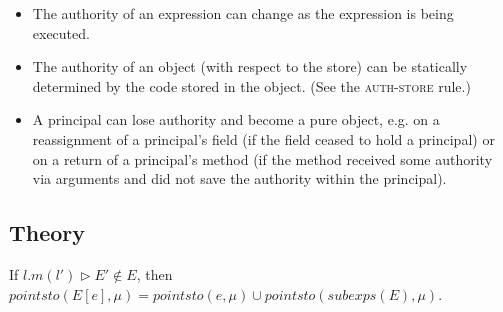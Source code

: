\documentclass{llncs}
\begin{document}
\begin{itemize}
\item The authority of an expression can change as the expression is being executed.

\item The authority of an object (with respect to the store) can be statically determined by the code stored in the object. (See the \textsc{auth-store} rule.)

\item A principal can lose authority and become a pure object, e.g. on a reassignment of a principal's field (if the field ceased to hold a principal) or on a return of a principal's method (if the method received some authority via arguments and did not save the authority within the principal).

\end{itemize}


\newpage

\subsection{Theory}

\begin{mdframed}
\begin{lemma}
\label{l:ses-e}
If $l.m(l') \rhd E' \not\in E$, then $pointsto(E[e], \mu) = pointsto(e, \mu) \cup pointsto(subexps(E), \mu)$.
\end{lemma}
\end{mdframed}
\end{document}

